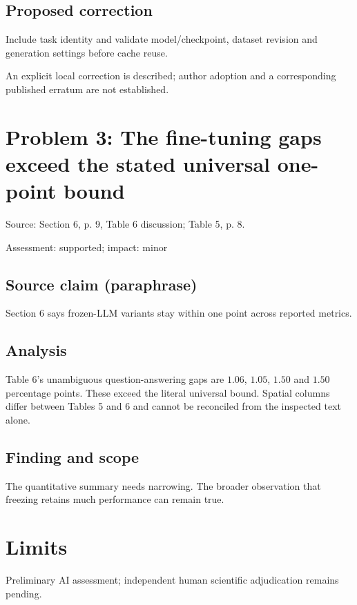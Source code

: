 \documentclass[11pt]{article}
\begin{document}
\subsection*{Proposed correction}

Include task identity and validate model/checkpoint, dataset revision and generation settings before cache reuse.

An explicit local correction is described; author adoption and a corresponding published erratum are not established.

\section*{Problem 3: The fine-tuning gaps exceed the stated universal one-point bound}

Source: Section 6, p. 9, Table 6 discussion; Table 5, p. 8.

Assessment: supported; impact: minor

\subsection*{Source claim (paraphrase)}

Section 6 says frozen-LLM variants stay within one point across reported metrics.

\subsection*{Analysis}

Table 6’s unambiguous question-answering gaps are \(1.06\), \(1.05\), \(1.50\) and \(1.50\) percentage points. These exceed the literal universal bound. Spatial columns differ between Tables 5 and 6 and cannot be reconciled from the inspected text alone.

\subsection*{Finding and scope}

The quantitative summary needs narrowing. The broader observation that freezing retains much performance can remain true.

\section*{Limits}

Preliminary AI assessment; independent human scientific adjudication remains pending.\par
\end{document}
